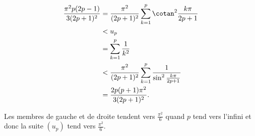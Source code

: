 {\begin{enumerate}
{\begin{align*}
\frac{\pi^2p(2p-1)}{3(2p+1)^2} &= \frac{\pi^2}{(2p+1)^2}\sum_{k=1}^{p}\cotan^2\frac{k\pi}{2p+1} \\
&< u_p \\
&= \sum_{k=1}^{p} \frac{1}{k^2} \\
&< \frac{\pi^2}{(2p+1)^2}\sum_{k=1}^{p}\frac{1}{\sin^2\frac{k\pi}{2p+1}} \\
&= \frac{2p(p+1)\pi^2}{3(2p+1)^2}.
\end{align*}

Les membres de gauche et de droite tendent vers $\frac{\pi^2}{6}$ quand $p$ tend vers l'infini et donc la suite $(u_p)$ tend vers $\frac{\pi^2}{6}$.}
\end{enumerate}
}
